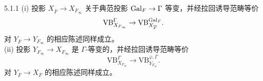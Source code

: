 \begin{thm}{5.1.1}\label{thm:a4-5-1-1}
(i) 投影 $X_{\overline{F}}\to X_{F_\infty}$ 关于典范投影 $\operatorname{Gal}_F\to\Gamma$ 等变，并经拉回诱导范畴等价
\[
\mathrm{VB}^{\Gamma}_{X_{F_\infty}}\to\mathrm{VB}^{\operatorname{Gal}_F}_{X_{\overline{F}}}.
\]
对 $Y_{\overline{F}}\to Y_{F_\infty}$ 的相应陈述同样成立。\\
(ii) 投影 $Y_{F_\infty}\to X_{F_\infty}$ 是 $\Gamma$-等变的，并经拉回诱导范畴等价
\[
\mathrm{VB}^{\Gamma}_{X_{F_\infty}}\to\mathrm{VB}^{\varphi,\Gamma}_{Y_{F_\infty}}.
\]
对 $Y_{\overline{F}}\to X_{\overline{F}}$ 的相应陈述同样成立。
\end{thm}

